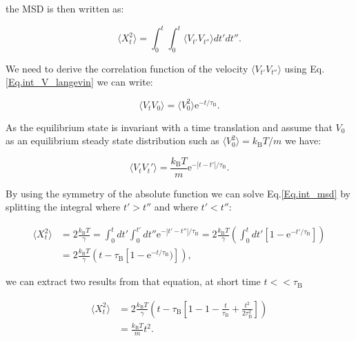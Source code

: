 
the \gls{MSD} is then written as:

\begin{equation}
	\langle X_t ^ 2 \rangle  = \int _0 ^ {t} \int _0 ^{t} \langle V_{t'}V_{t''} \rangle dt'dt''.
	\label{Eq.int_msd}
\end{equation}

We need to derive the correlation function of the velocity $ \langle V_{t'}V_{t''} \rangle $ using Eq.\ref{Eq.int_V_langevin} we can write:

\begin{equation}
	\langle V_t V_0 \rangle = \langle V_0 ^2 \rangle \mathrm{e}^{-t/\tau_{\mathrm{B}}}.
\end{equation}

As the equilibrium state is invariant with a time translation and assume that $V_0$ as an equilibrium steady state distribution such as $\langle V_0^2 \rangle = k_\mathrm{B} T / m$ we have:

\begin{equation}
	\langle V_t V_t' \rangle = \frac{k_\mathrm{B}T}{m} \mathrm{e}^{-|t-t'|/\tau_{\mathrm{B}}}.
\end{equation}

By using the symmetry of the absolute function we can solve Eq.\ref{Eq.int_msd} by splitting the integral where $t'>t''$ and where $ t' < t''$:

\begin{equation}
	\begin{aligned}
	\langle X_t ^2 \rangle & =   2 \frac{k_\mathrm{B}T}{\gamma} = \int _0 ^t dt' \int _0 ^{t'} dt'' \mathrm{e} ^ {- |t' - t''| / \tau_\mathrm{B}} = 2 \frac{k_\mathrm{B}T}{\gamma} \left( \int_0 ^t dt' \left[1 - \mathrm{e}^{-t'/\tau_\mathrm{B}} \right] \right) \\
	& = 2 \frac{k_\mathrm{B} T}{\gamma} \left( t - \tau_\mathrm{B} \left[ 1 - \mathrm{e}^{-t/\tau_\mathrm{B}}) \right] \right),
	\end{aligned}
\end{equation}

we can extract two results from that equation, at short time $t << \tau_\mathrm{B}$

\begin{equation}
	\begin{aligned}
	\langle X_t ^2 \rangle & =  2 \frac{k_\mathrm{B} T}{\gamma} \left( t - \tau_\mathrm{B} \left[ 1 - 1 - \frac{t}{\tau_\mathrm{B}} + \frac{t^2}{ 2 \tau_\mathrm{B} ^2}\right]         \right) \\
	& = \frac{k_\mathrm{B} T}{m} t^2.
	\end{aligned}
\end{equation}

